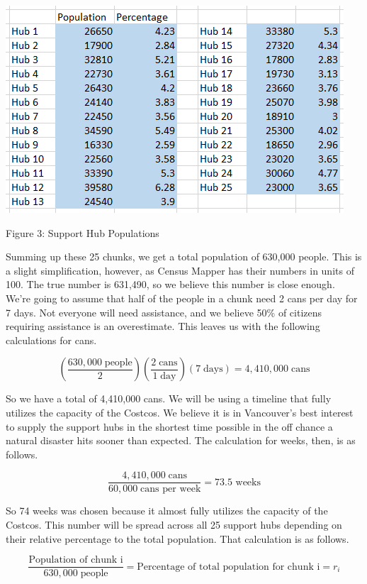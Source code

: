 \documentclass{article}
\begin{document}
\begin{center}
    \includegraphics[scale=0.5]{hub_populations.png}
    
    \caption{Figure 3: Support Hub Populations}
\end{center}

Summing up these 25 chunks, we get a total population of 630,000 people. This is a slight simplification, however, as Census Mapper has their numbers in units of 100. The true number is 631,490, so we believe this number is close enough. We're going to assume that half of the people in a chunk need 2 cans per day for 7 days. Not everyone will need assistance, and we believe 50\% of citizens requiring assistance is an overestimate. This leaves us with the following calculations for cans.

\[(\frac{630,000 \;\text{people}}{2}) (\frac{2 \;\text{cans}}{1 \;\text{day}}) (7\;\text{days}) = 4,410,000\;\text{cans}\]

So we have a total of 4,410,000 cans. We will be using a timeline that fully utilizes the capacity of the Costcos. We believe it is in Vancouver's best interest to supply the support hubs in the shortest time possible in the off chance a natural disaster hits sooner than expected. The calculation for weeks, then, is as follows.

\[\frac{4,410,000\;\text{cans}}{60,000\;\text{cans per week}} = \text{73.5 weeks}\]

So 74 weeks was chosen because it almost fully utilizes the capacity of the Costcos. This number will be spread across all 25 support hubs depending on their relative percentage to the total population. That calculation is as follows.

\[\frac{\text{Population of chunk i}}{630,000 \;\text{people}} = \text{Percentage of total population for chunk i} = r_{i}\]
\end{document}
